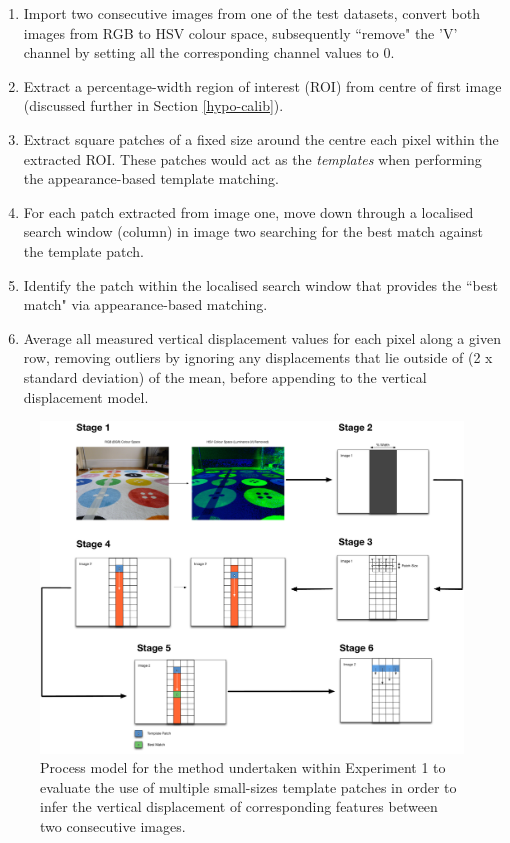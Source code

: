 \begin{enumerate}
\item Import two consecutive images from one of the test datasets, convert both images from RGB to HSV colour space, subsequently ``remove" the 'V' channel by setting all the corresponding channel values to 0.
\item Extract a percentage-width region of interest (ROI) from centre of first image (discussed further in Section \ref{hypo-calib}).
\item Extract square patches of a fixed size around the centre each pixel within the extracted ROI. These patches would act as the \textit{templates} when performing the appearance-based template matching. 
\item For each patch extracted from image one, move down through a localised search window (column) in image two searching for the best match against the template patch.
\item Identify the patch within the localised search window that provides the ``best match" via appearance-based matching.
\item Average all measured vertical displacement values for each pixel along a given row, removing outliers by ignoring any displacements that lie outside of (2 x standard deviation) of the mean, before appending to the vertical displacement model.
\end{enumerate}

\clearpage
\begin{figure}[ht!]
\centering
\includegraphics[scale=0.25]{images/ex1stages.pdf}
  \caption{Process model for the method undertaken within Experiment 1 to evaluate the use of multiple small-sizes template patches in order to infer the vertical displacement of corresponding features between two consecutive images.}
\label{fig:ex1process}
\end{figure} 

